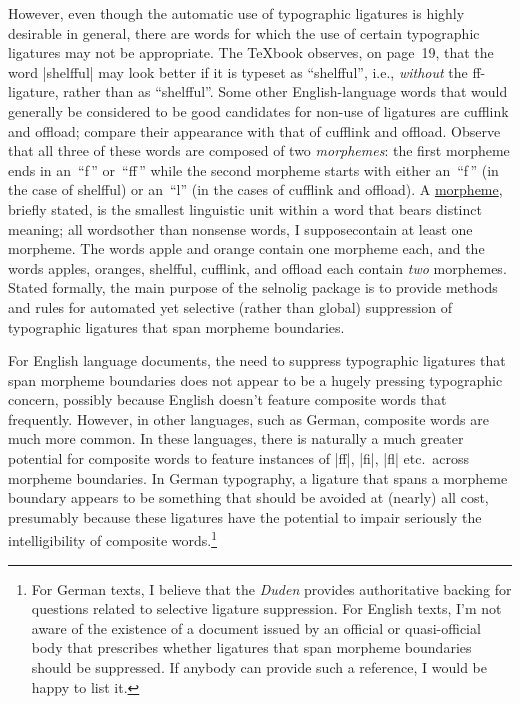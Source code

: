 \documentclass[11pt]{article}
\newcommand{\pkg}[1]{\textsf{#1}}
\begin{document}
However, even though the automatic use of typographic ligatures is highly desirable in general, there are words for which the use of certain typographic ligatures may not be appropriate. The \TeX book observes, on page~19, that the word |shelfful| may look better if it is typeset as \enquote{shelfful}, i.e., \emph{without} the ff-ligature, rather than as \enquote{\mbox{shelfful}}. Some other English-language words that would generally be considered to be good candidates for non-use of ligatures are \mbox{cufflink} and \mbox{offload}; compare their appearance with that of cufflink and offload. Observe that all three of these words are composed of two \emph{morphemes}: the first morpheme ends in an~\enquote{f\,} or~\enquote{ff\,} while the second morpheme starts with either an~\enquote{f\,} (in the case of shelfful) or an~\enquote{l} (in the cases of cufflink and offload). A \href{http://en.wikipedia.org/wiki/Morpheme}{morpheme}, briefly stated, is the smallest linguistic unit within a word that bears distinct meaning; all words\textemdash other than nonsense words, I suppose\textemdash contain at least one morpheme. The words apple and orange contain one morpheme each, and the words apples, oranges, shelfful, cufflink, and offload each contain \emph{two} morphemes. Stated formally, the main purpose of the \pkg{selnolig} package is to provide methods and rules for automated yet selective (rather than global) suppression of typographic ligatures that span morpheme boundaries.

For English language documents, the need to suppress typographic ligatures that span morpheme boundaries does not appear to be a hugely pressing typographic concern, possibly because English doesn't feature composite words that frequently. However, in other languages, such as German, composite words are much more common. In these languages, there is naturally a much greater potential for composite words to feature instances of |ff|, |fi|, |fl| etc.\ across morpheme boundaries. In German typography, a ligature that spans a morpheme boundary appears to be something that should be avoided at (nearly) all cost, presumably because these ligatures have the potential to impair seriously the intelligibility of composite words.\footnote{For German texts, I believe that the \emph{Duden} provides authoritative backing for questions related to selective ligature suppression. For English texts, I'm not aware of the existence of a document issued by an official or quasi-official body that prescribes whether ligatures that span morpheme boundaries should be suppressed. If anybody can provide such a reference, I would be happy to list it.}
\end{document}
